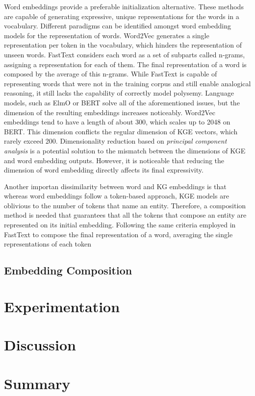 Word embeddings provide a preferable initialization alternative. These methods are capable of generating expressive, unique representations for the words in a vocabulary. Different paradigms can be identified amongst word embedding models for the representation of words. Word2Vec \citep{word2vec} generates a single representation per token in the vocabulary, which hinders the representation of unseen words. FastText \citep{fasttext1,fasttext2} considers each word as a set of subparts called n-grams, assigning a representation for each of them. The final representation of a word is composed by the average of this n-grams. While FastText is capable of representing words that were not in the training corpus and still enable analogical reasoning, it still lacks the capability of correctly model polysemy. Language models, such as ElmO \citep{elmo} or BERT \citep{bert} solve all of the aforementioned issues, but the dimension of the resulting embeddings increases noticeably. Word2Vec embeddings tend to have a length of about 300, which scales up to 2048 on BERT. This dimension conflicts the regular dimension of KGE vectors, which rarely exceed 200. Dimensionality reduction based on \textit{principal component analysis} \citep{dim_reduction} is a potential solution to the mismatch between the dimensions of KGE and word embedding outputs. However, it is noticeable that reducing the dimension of word embedding directly affects its final expressivity. 

Another importan dissimilarity between word and KG embeddings is that whereas word embeddings follow a token-based approach, KGE models are oblivious to the number of tokens that name an entity. Therefore, a composition method is needed that guarantees that all the tokens that compose an entity are represented on its initial embedding. Following the same criteria employed in FastText to compose the final representation of a word, averaging the single representations of each token 



\subsection{Embedding Composition}


\section{Experimentation}
\section{Discussion}





\section{Summary}